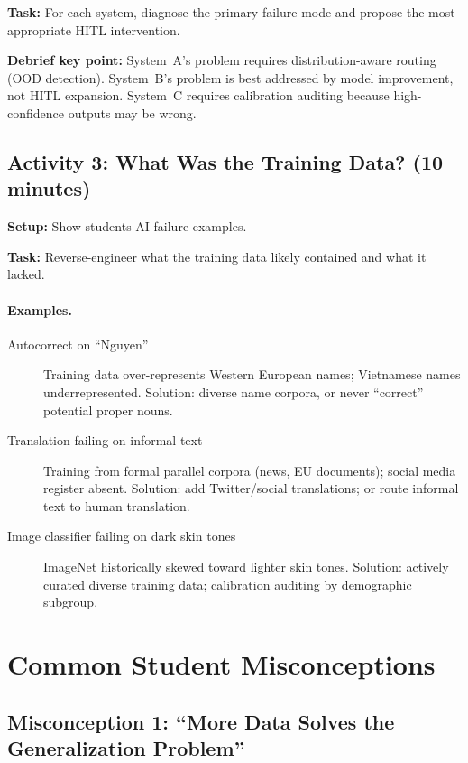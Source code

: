 \textbf{Task:} For each system, diagnose the primary failure mode and propose the most appropriate HITL intervention.

\textbf{Debrief key point:} System~A's problem requires distribution-aware routing (OOD detection). System~B's problem is best addressed by model improvement, not HITL expansion. System~C requires calibration auditing because high-confidence outputs may be wrong.

\subsection{Activity 3: What Was the Training Data? (10 minutes)}

\textbf{Setup:} Show students AI failure examples.

\textbf{Task:} Reverse-engineer what the training data likely contained and what it lacked.

\paragraph{Examples.}
\begin{description}
    \item[Autocorrect on ``Nguyen''] Training data over-represents Western European names; Vietnamese names underrepresented. Solution: diverse name corpora, or never ``correct'' potential proper nouns.
    \item[Translation failing on informal text] Training from formal parallel corpora (news, EU documents); social media register absent. Solution: add Twitter/social translations; or route informal text to human translation.
    \item[Image classifier failing on dark skin tones] ImageNet historically skewed toward lighter skin tones. Solution: actively curated diverse training data; calibration auditing by demographic subgroup.
\end{description}

\section{Common Student Misconceptions}

\subsection{Misconception 1: ``More Data Solves the Generalization Problem''}

